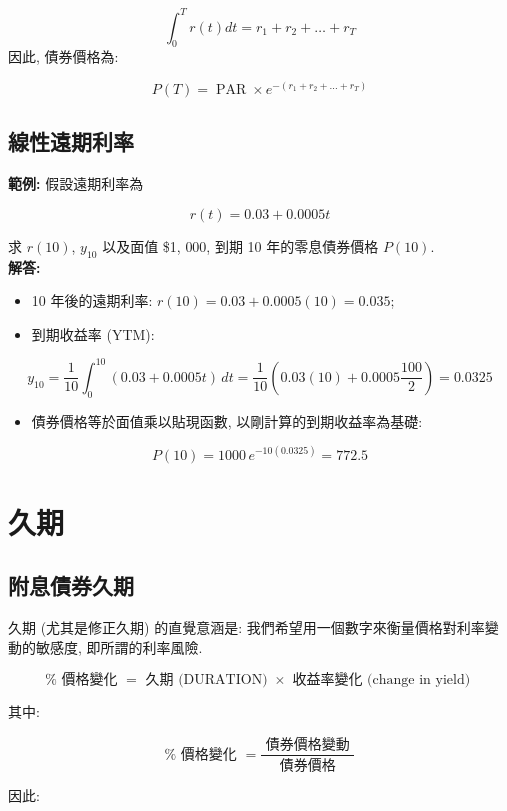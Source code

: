 \documentclass[letterpaper]{article}
\begin{document}
		
		$$
		\int_{0}^{T} r (t) d t=r_{1}+r_{2}+\ldots+r_{T}
		$$
		因此, 債券價格為: 
		
		$$
		P (T) = \operatorname{PAR} \times e^{-\left (r_{1} + r_{2} + \ldots + r_{T}\right) }
		$$
		
		\subsection{線性遠期利率}
		\textbf{範例: } 假設遠期利率為
		
		$$
		r (t) = 0.03 + 0.0005t
		$$
		
		求 $r (10) $, $y_{10}$ 以及面值 \$1{, }000, 到期 10 年的零息債券價格 $P (10) $.  \\
		\textbf{解答: }
		
		\begin{itemize}
			\item 10 年後的遠期利率: $r (10) = 0.03 + 0.0005 (10) = 0.035$; 
			\item 到期收益率 (YTM): 
		\end{itemize}
		
		$$
		y_{10} = \frac{1}{10} \int_{0}^{10} (0.03 + 0.0005t) \, dt 
		= \frac{1}{10}\left (0.03 (10) + 0.0005 \frac{100}{2}\right) 
		= 0.0325
		$$
		
		\begin{itemize}
			\item 債券價格等於面值乘以貼現函數, 以剛計算的到期收益率為基礎: 
		\end{itemize}
		
		$$
		P (10) = 1000\, e^{-10 (0.0325) } = 772.5
		$$
		
		\section{久期}
		
		\subsection{附息債券久期}
		久期 (尤其是修正久期) 的直覺意涵是: 我們希望用一個數字來衡量價格對利率變動的敏感度, 即所謂的利率風險.  
		
		$$
		\% \text{ 價格變化 } = \text{ 久期 (DURATION) } \times \text{ 收益率變化 (change in yield) }
		$$
		
		其中: 
		
		$$
		\% \text{ 價格變化 } = \frac{\text{ 債券價格變動 }}{\text{ 債券價格 }}
		$$
		
		因此: 
		
\end{document}

